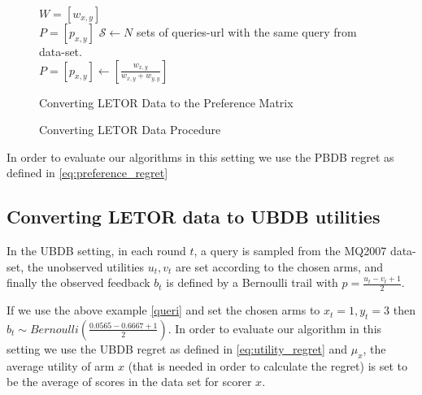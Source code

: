 \documentclass[MSc,beforeExam]{iitcsthesis}
\begin{document}
\begin{figure}[h]
	\IncMargin{1em}
		\begin{algorithm}[H]
		
		$W =[w_{x,y}]$\\
		$P =[p_{x,y}]$
		\BlankLine
		$\mathcal{S} \leftarrow N$ sets of queries-url with the same query from data-set.\\
		$P =[p_{x,y}]\leftarrow \left[\frac{w_{x,y}}{w_{x,y}+w_{y,y}}\right]$

			\caption{Converting LETOR Data to the Preference Matrix}
		\end{algorithm}
		\caption{Converting LETOR Data Procedure}\label{data_converting}
	\end{figure}

In order to evaluate our algorithms in this setting we use the PBDB regret as defined in \eqref{eq:preference_regret}

\subsection{Converting LETOR data to UBDB utilities}

In the UBDB setting, in each round $t$, a query is sampled from the MQ2007 data-set, the unobserved utilities $u_t,v_t$ are set according to the chosen arms, and finally the observed feedback $b_t$ is defined by a Bernoulli trail with $ p = \frac{u_t -v_t+1}{2}$.

If we use the above example \eqref{queri} and set the chosen arms to $x_t = 1, y_t=3$ then $b_t \sim \textit{Bernoulli}\left(\frac{0.0565 -0.6667+1}{2}\right)$.
In order to evaluate our algorithm in this setting we use the UBDB regret as defined in \eqref{eq:utility_regret} and $\mu_x$, the average utility of arm $x$ (that is needed in order to calculate the regret) is set to be the average of scores in the data set for scorer $x$.
\end{document}
